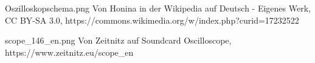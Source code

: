 Oszilloskopschema.png
Von Honina in der Wikipedia auf Deutsch - Eigenes Werk, CC BY-SA 3.0, https://commons.wikimedia.org/w/index.php?curid=17232522











scope_146_en.png
Von Zeitnitz auf Soundcard Oscilloscope, https://www.zeitnitz.eu/scope_en